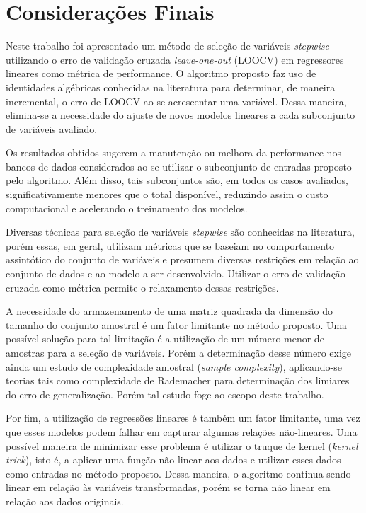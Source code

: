 \chapter[Considerações Finais]{Considerações Finais}

Neste trabalho foi apresentado um método de seleção de variáveis \textit{stepwise} utilizando o erro de validação cruzada \textit{leave-one-out} (LOOCV) em regressores lineares como métrica de performance. O algoritmo proposto faz uso de identidades algébricas conhecidas na literatura para determinar, de maneira incremental, o erro de LOOCV ao se acrescentar uma variável. Dessa maneira, elimina-se a necessidade do ajuste de novos modelos lineares a cada subconjunto de variáveis avaliado.

Os resultados obtidos sugerem a manutenção ou melhora da performance nos bancos de dados considerados ao se utilizar o subconjunto de entradas proposto pelo algoritmo. Além disso, tais subconjuntos são, em todos os casos avaliados, significativamente menores que o total disponível, reduzindo assim o custo computacional e acelerando o treinamento dos modelos.

Diversas técnicas para seleção de variáveis \textit{stepwise} são conhecidas na literatura, porém essas, em geral, utilizam métricas que se baseiam no comportamento assintótico do conjunto de variáveis e presumem diversas restrições em relação ao conjunto de dados e ao modelo a ser desenvolvido. Utilizar o erro de validação cruzada como métrica permite o relaxamento dessas restrições.

A necessidade do armazenamento de uma matriz quadrada da dimensão do tamanho do conjunto amostral é um fator limitante no método proposto. Uma possível solução para tal limitação é a utilização de um número menor de amostras para a seleção de variáveis. Porém a determinação desse número exige ainda um estudo de complexidade amostral (\textit{sample complexity}), aplicando-se teorias tais como complexidade de Rademacher para determinação dos limiares do erro de generalização. Porém tal estudo foge ao escopo deste trabalho.

Por fim, a utilização de regressões lineares é também um fator limitante, uma vez que esses modelos podem falhar em capturar algumas relações não-lineares. Uma possível maneira de minimizar esse problema é utilizar o truque de kernel (\textit{kernel trick})\cite{peaking_phenomenon}, isto é, a aplicar uma função não linear aos dados e utilizar esses dados como entradas no método proposto. Dessa maneira, o algoritmo continua sendo linear em relação às variáveis transformadas, porém se torna não linear em relação aos dados originais.